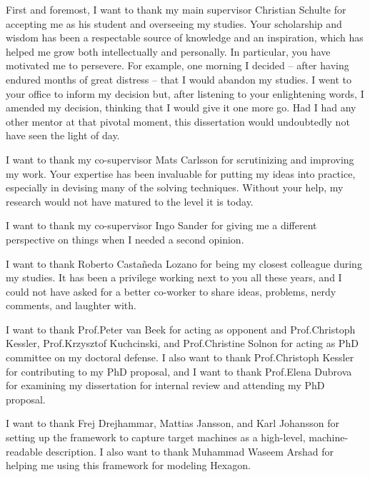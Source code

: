 %

\begin{acknowledgements}
  First and foremost, I want to thank my main supervisor Christian Schulte for
  accepting me as his student and overseeing my studies.
  Your scholarship and wisdom has been a respectable source of knowledge and an
  inspiration, which has helped me grow both intellectually and personally.
  In particular, you have motivated me to persevere.
  For example, one morning I decided -- after having endured months of great
  distress -- that I would abandon my studies.
  I went to your office to inform my decision but, after listening to your
  enlightening words, I amended my decision, thinking that I would give it one
  more go.
  Had I had any other mentor at that pivotal moment, this dissertation would
  undoubtedly not have seen the light of day.

  I want to thank my co-supervisor Mats Carlsson for scrutinizing and improving
  my work.
  Your expertise has been invaluable for putting my ideas into practice,
  especially in devising many of the solving techniques.
  Without your help, my research would not have matured to the level it is
  today.

  I want to thank my co-supervisor Ingo Sander for giving me a different
  perspective on things when I needed a second opinion.

  I want to thank Roberto Casta\~neda Lozano for being my closest colleague
  during my studies.
  It has been a privilege working next to you all these years, and I could not
  have asked for a better co-worker to share ideas, problems, nerdy comments,
  and laughter with.

  I want to thank Prof.\thinspace Peter van Beek for acting as opponent and
  Prof.\thinspace Christoph Kessler, Prof.\thinspace Krzysztof Kuchcinski, and
  Prof.\thinspace Christine Solnon for acting as PhD committee on my doctoral
  defense.
  I also want to thank Prof.\thinspace Christoph Kessler for contributing to my
  PhD proposal, and I want to thank Prof.\thinspace Elena Dubrova for examining
  my dissertation for internal review and attending my PhD proposal.

  I want to thank Frej Drejhammar, Mattias Jansson, and Karl Johansson for
  setting up the framework to capture \glspl{target machine} as a high-level,
  machine-readable description.
  I also want to thank Muhammad Waseem Arshad for helping me using this
  framework for modeling \gls{Hexagon}.


\end{acknowledgements}
